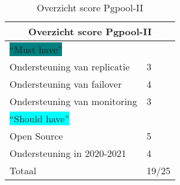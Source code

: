 \begin{table}[!h]
    \centering
    \begin{tabular}{ |p{6cm}||p{6cm}|  }
        \hline
        \multicolumn{2}{|c|}{Overzicht score Pgpool-II} \\
        \hline
        \colorbox{teal}{“Must have”} & \\
        \hline
        Ondersteuning van replicatie  & 3 \\
        Ondersteuning van failover &  4 \\
        Ondersteuning van monitoring & 3 \\
        \hline
        \colorbox{cyan}{“Should have”} & \\
        \hline
        Open Source &  5 \\
        Ondersteuning in 2020-2021 & 4 \\
        \hline
        \hline
        Totaal & 19/25 \\
        \hline
    \end{tabular}
    \caption{Overzicht score Pgpool-II}
    \label{table:Overzicht score Pgpool-II}
\end{table}
